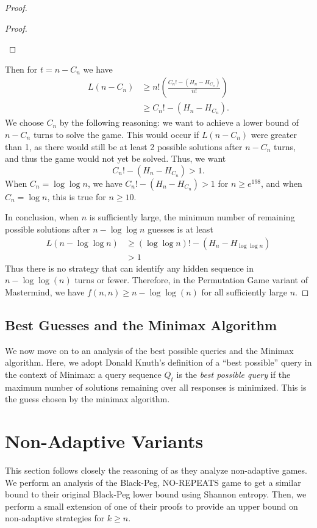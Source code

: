 \documentclass[12pt, a4paper]{article}
\begin{document}
\begin{proof}
\begin{enumerate}[label=]
\begin{proof}
\begin{enumerate}[label=]
		\end{enumerate}
		\end{proof}

	\end{enumerate}
	Then for $t = n-C_n$ we have
	\begin{align*}
	L(n-C_{n}) & \ge n!\left(\frac{C_{n}! - (H_n - H_{C_{n}})}{n!}\right)\\
	& \ge C_{n}! - (H_n-H_{C_{n}}).
	\end{align*}
	We choose $C_{n}$ by the following reasoning: we want to achieve a lower bound of $n-C_{n}$ turns to solve the game. This would occur if $L(n-C_n)$ were greater than 1, as there would still be at least 2 possible solutions after $n-C_n$ turns, and thus the game would not yet be solved. Thus, we want
		\begin{equation*}
			C_{n}! - (H_n - H_{C_{n}}) > 1.
		\end{equation*}
		When $C_{n}=\log\log n$, we have $C_{n}! - (H_n - H_{C_{n}}) > 1$ for $n\ge e^{198}$, and when $C_{n}=\log n$, this is true for $n\ge 10$.
		
 	In conclusion, when $n$ is sufficiently large, the minimum number of remaining
	possible solutions after $n - \log\log n$ guesses is at least
		\begin{align*}
		L(n-\log\log n)
		& \ge (\log\log n)! - (H_n - H_{\log\log n})\\
		& > 1
		\end{align*}
	Thus there is no strategy that can identify any hidden sequence in $n-\log\log(n)$ turns or fewer. Therefore, in the Permutation Game variant of Mastermind, we have $f(n, n)\ge n - \log\log(n)$ for all sufficiently large $n$.
	\end{proof}

\subsection{Best Guesses and the Minimax Algorithm}
We now move on to an analysis of the best possible queries and the Minimax algorithm. Here, we adopt Donald Knuth's definition of a ``best possible'' query in the context of Minimax\cite{DK76}: a query sequence $Q_t$ is the \textit{best possible query} if the maximum number of solutions remaining over all responses is minimized. This is the guess chosen by the minimax algorithm.


\clearpage

\section{Non-Adaptive Variants}
This section follows closely the reasoning of \cite{DS13} as they analyze non-adaptive games. 
We perform an analysis of the Black-Peg, NO-REPEATS game to get a similar bound to their original
Black-Peg lower bound using Shannon entropy. Then, we perform a small extension of one of their proofs to 
provide an upper bound on non-adaptive strategies for $k \geq n$.
\end{document}
